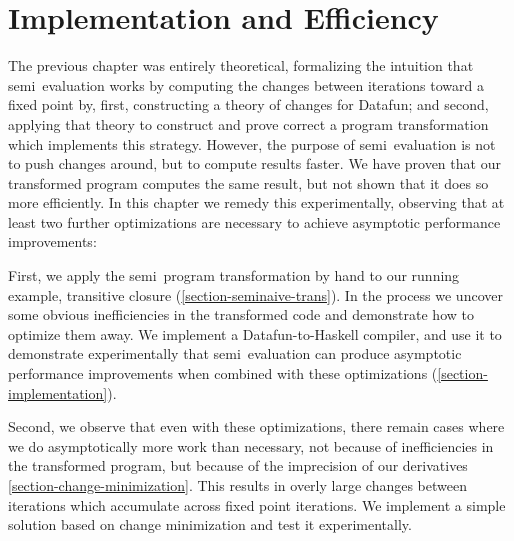 \chapter{Implementation and Efficiency}

\newcommand\deep{\mathvar{dp}}

The previous chapter was entirely theoretical, formalizing the intuition that
semi\naive\ evaluation works by computing the changes between iterations toward
a fixed point by, first, constructing a theory of changes for Datafun; and
second, applying that theory to construct and prove correct a program
transformation which implements this strategy. However, the purpose of
semi\naive\ evaluation is not to push changes around, but to compute results
faster. We have proven that our transformed program computes the same result,
but not shown that it does so more efficiently.
%
In this chapter we remedy this experimentally, observing that at least two
further optimizations are necessary to achieve asymptotic performance
improvements:


First, we apply the semi\naive\ program transformation by hand to our running
example, transitive closure (\cref{section-seminaive-trans}).
%
In the process we uncover some obvious inefficiencies in the transformed code
and demonstrate how to optimize them away.
%
We implement a Datafun-to-Haskell compiler, and use it to demonstrate
experimentally that semi\naive\ evaluation can produce asymptotic performance
improvements when combined with these optimizations
(\cref{section-implementation}).

Second, we observe that even with these optimizations, there remain cases where
we do asymptotically more work than necessary, not because of inefficiencies in
the transformed program, but because of the imprecision of our derivatives
\cref{section-change-minimization}. This results in overly large changes between
iterations which accumulate across fixed point iterations. We implement a simple
solution based on change minimization and test it experimentally.





